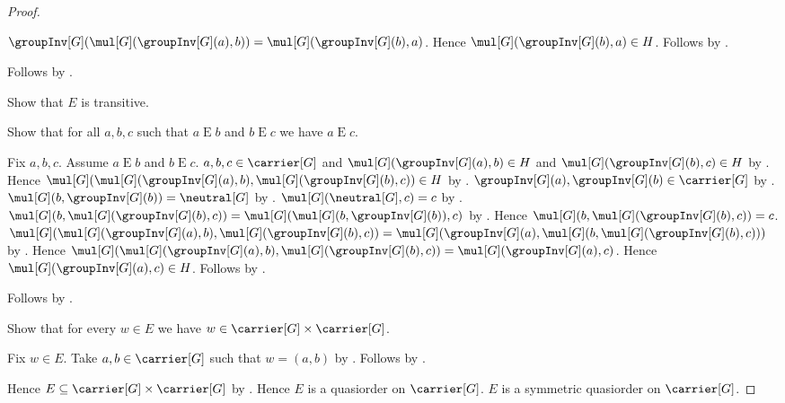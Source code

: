 \begin{proof}
\begin{subproof}
\begin{subproof}
            $\groupInv[G](\mul[G](\groupInv[G](a),b))
                =\mul[G](\groupInv[G](b),a)$.
            Hence $\mul[G](\groupInv[G](b),a)\in H$.
            Follows by .
        \end{subproof}
        Follows by .
    \end{subproof}
    Show that $E$ is transitive.
    \begin{subproof}
        Show that for all $a,b,c$ such that $a\mathrel{E}b$ and
            $b\mathrel{E}c$ we have $a\mathrel{E}c$.
        \begin{subproof}
            Fix $a,b,c$.
            Assume $a\mathrel{E}b$ and $b\mathrel{E}c$.
            $a,b,c\in\carrier[G]$ and
                $\mul[G](\groupInv[G](a),b)\in H$ and
                $\mul[G](\groupInv[G](b),c)\in H$ by
                .
            Hence
                $\mul[G]
                    (\mul[G](\groupInv[G](a),b),
                     \mul[G](\groupInv[G](b),c))\in H$ by
                .
            $\groupInv[G](a),\groupInv[G](b)\in\carrier[G]$ by
                .
            $\mul[G](b,\groupInv[G](b))=\neutral[G]$ by
                .
            $\mul[G](\neutral[G],c)=c$ by
                .
            $\mul[G](b,\mul[G](\groupInv[G](b),c))
                =\mul[G](\mul[G](b,\groupInv[G](b)),c)$ by
                .
            Hence
                $\mul[G](b,\mul[G](\groupInv[G](b),c))=c$.
            $\mul[G]
                (\mul[G](\groupInv[G](a),b),
                 \mul[G](\groupInv[G](b),c))
                =\mul[G]
                    (\groupInv[G](a),
                     \mul[G](b,\mul[G](\groupInv[G](b),c)))$ by
                .
            Hence
                $\mul[G]
                    (\mul[G](\groupInv[G](a),b),
                     \mul[G](\groupInv[G](b),c))
                =\mul[G](\groupInv[G](a),c)$.
            Hence $\mul[G](\groupInv[G](a),c)\in H$.
            Follows by .
        \end{subproof}
        Follows by .
    \end{subproof}
    Show that for every $w\in E$ we have
        $w\in\carrier[G]\times\carrier[G]$.
    \begin{subproof}
        Fix $w\in E$.
        Take $a,b\in\carrier[G]$ such that $w=(a,b)$ by
            .
        Follows by .
    \end{subproof}
    Hence $E\subseteq\carrier[G]\times\carrier[G]$ by
        .
    Hence $E$ is a quasiorder on $\carrier[G]$.
    $E$ is a symmetric quasiorder on $\carrier[G]$.
\end{proof}

